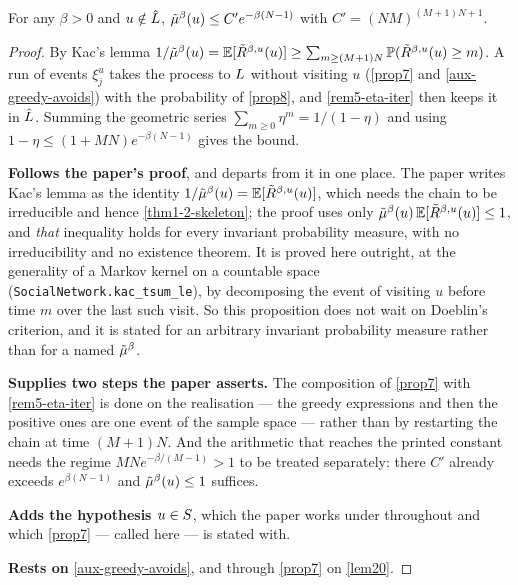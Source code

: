 \begin{proposition}
  \label{prop9}
  \leanok
  For any $\beta > 0$ and $u \notin \hat{L}$,
  $\tilde{\mu}^\beta(u) \le C' e^{-\beta(N-1)}$ with $C' = (NM)^{(M+1)N+1}$.
\end{proposition}
\begin{proof}
  \leanok
  By Kac's lemma $1/\tilde{\mu}^\beta(u) = \mathbb{E}[\tilde{R}^{\beta,u}(u)] \ge \sum_{m \ge
  (M+1)N} \mathbb{P}(\tilde{R}^{\beta,u}(u) \ge m)$.  A run of events $\xi_j^u$ takes the
  process to $L$ without visiting $u$ (\ref{prop7} and
  \ref{aux-greedy-avoids}) with the probability of \ref{prop8}, and
  \ref{rem5-eta-iter} then keeps it in $\hat{L}$.  Summing the geometric series
  $\sum_{m \ge 0} \eta^m = 1/(1-\eta)$ and using $1 - \eta \le (1 + MN)
  e^{-\beta(N-1)}$ gives the bound.

  \textbf{Follows the paper's proof}, and departs from it in one place.  The
  paper writes Kac's lemma as the identity $1/\tilde{\mu}^\beta(u) =
  \mathbb{E}[\tilde{R}^{\beta,u}(u)]$, which needs the chain to be irreducible and hence
  \ref{thm1-2-skeleton}; the proof uses only
  $\tilde{\mu}^\beta(u)\,\mathbb{E}[\tilde{R}^{\beta,u}(u)] \le 1$, and \emph{that} inequality
  holds for every invariant probability measure, with no irreducibility and no
  existence theorem.  It is proved here outright, at the generality of a Markov
  kernel on a countable space (\texttt{SocialNetwork.kac\_tsum\_le}), by
  decomposing the event of visiting $u$ before time $m$ over the last such
  visit.  So this proposition does not wait on Doeblin's criterion, and it is
  stated for an arbitrary invariant probability measure rather than for a named
  $\tilde{\mu}^\beta$.

  \textbf{Supplies two steps the paper asserts.} The composition of \ref{prop7}
  with \ref{rem5-eta-iter} is done on the realisation --- the greedy
  expressions and then the positive ones are one event of the sample space ---
  rather than by restarting the chain at time $(M+1)N$.  And the arithmetic
  that reaches the printed constant needs the regime $MN e^{-\beta/(M-1)} > 1$
  to be treated separately: there $C'$ already exceeds $e^{\beta(N-1)}$ and
  $\tilde{\mu}^\beta(u) \le 1$ suffices.

  \textbf{Adds the hypothesis $u \in S$}, which the paper works under
  throughout and which \ref{prop7} --- called here --- is stated with.

  \textbf{Rests on} \ref{aux-greedy-avoids}, and through \ref{prop7} on
  \ref{lem20}.
\end{proof}


